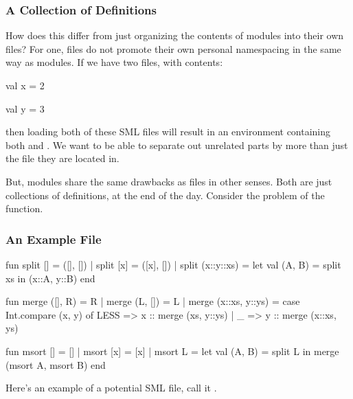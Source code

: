 \documentclass[aspectratio=169]{beamer}
\begin{document}
\begin{frame}[fragile]
  \frametitle{A Collection of Definitions}

  How does this differ from just organizing the contents of modules into
  their own files? For one, files do not promote their own personal
  namespacing in the same way as modules. If we have two files, with contents:

  \begin{codeblock}
    val x = 2
  \end{codeblock}

  \begin{codeblock}
    val y = 3
  \end{codeblock}

  then loading both of these SML files will result in an environment containing
  both  and . We want to be able to separate out unrelated parts
  by more than just the file they are located in.

  \pause
  \vspace{\fill}

  But, modules share the same drawbacks as files in other senses. Both are just
  collections of definitions, at the end of the day. Consider the problem of
  the  function.
\end{frame}

\begin{frame}[fragile]
  \frametitle{An Example File}

  {\tiny
  \begin{codeblock}
    fun split [] = ([], [])
      | split [x] = ([x], [])
      | split (x::y::xs) =
          let
            val (A, B) = split xs
          in
            (x::A, y::B)
          end

    fun merge ([], R) = R
      | merge (L, []) = L
      | merge (x::xs, y::ys) =
          case Int.compare (x, y) of
            LESS => x :: merge (xs, y::ys)
          | _ => y :: merge (x::xs, ys)

    fun msort [] = []
      | msort [x] = [x]
      | msort L =
          let
            val (A, B) = split L
          in
            merge (msort A, msort B)
          end
  \end{codeblock}
  }

  \pause
  \vspace{\fill}

  Here's an example of a potential SML file, call it .
\end{frame}
\end{document}
